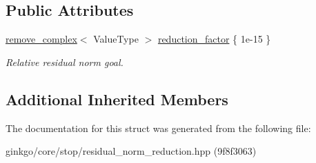 \subsection*{Public Attributes}
\begin{DoxyCompactItemize}
\item 
\mbox{\label{structgko_1_1stop_1_1ResidualNormReduction_1_1parameters__type_a488ffd39d7ea7fc9093a0e7604be2746}} 
\hyperlink{namespacegko_adfcb75c44f6b6c701989419c166f6e7e}{remove\+\_\+complex}$<$ Value\+Type $>$ \hyperlink{structgko_1_1stop_1_1ResidualNormReduction_1_1parameters__type_a488ffd39d7ea7fc9093a0e7604be2746}{reduction\+\_\+factor} \{ 1e-\/15 \}
\begin{DoxyCompactList}\small\item\em Relative residual norm goal. \end{DoxyCompactList}\end{DoxyCompactItemize}
\subsection*{Additional Inherited Members}


The documentation for this struct was generated from the following file\+:\begin{DoxyCompactItemize}
\item 
ginkgo/core/stop/residual\+\_\+norm\+\_\+reduction.\+hpp (9f8f3063)\end{DoxyCompactItemize}
